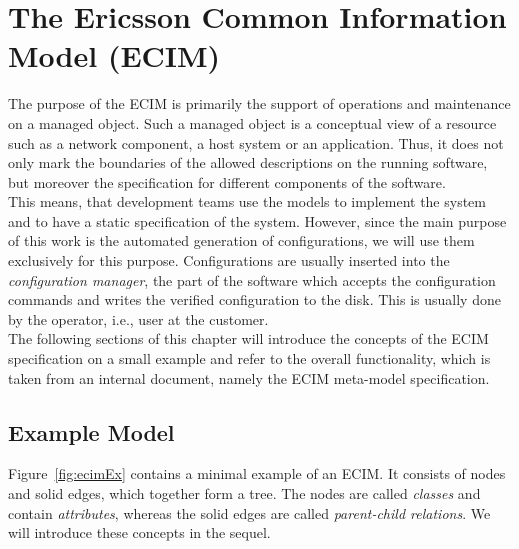 \chapter{The Ericsson Common Information Model (ECIM)}\label{chap:ecim}

The purpose of the ECIM is primarily the support of operations and maintenance on a managed object. Such a managed object is a conceptual view of a resource such as a network component, a host system or an application. Thus, it does not only mark the boundaries of the allowed descriptions on the running software, but moreover the specification for different components of the software. \\

This means, that development teams use the models to implement the system and to have a static specification of the system. However, since the main purpose of this work is the automated generation of configurations, we will use them exclusively for this purpose. Configurations are usually inserted into the \emph{configuration manager}, the part of the software which accepts the configuration commands and writes the verified configuration to the disk. This is usually done by the operator, i.e., user at the customer.\\


The following sections of this chapter will introduce the concepts of the ECIM specification on a small example and refer to the overall functionality, which is taken from an internal document, namely the ECIM meta-model specification. 

\section{Example Model}\label{sec:example-model}

Figure~\ref{fig:ecimEx} contains a minimal example of an ECIM. It consists of nodes and solid edges, which together form a tree. The nodes are called \emph{classes} and contain \emph{attributes}, whereas the solid edges are called \emph{parent-child relations}. We will introduce these concepts in the sequel.\\



